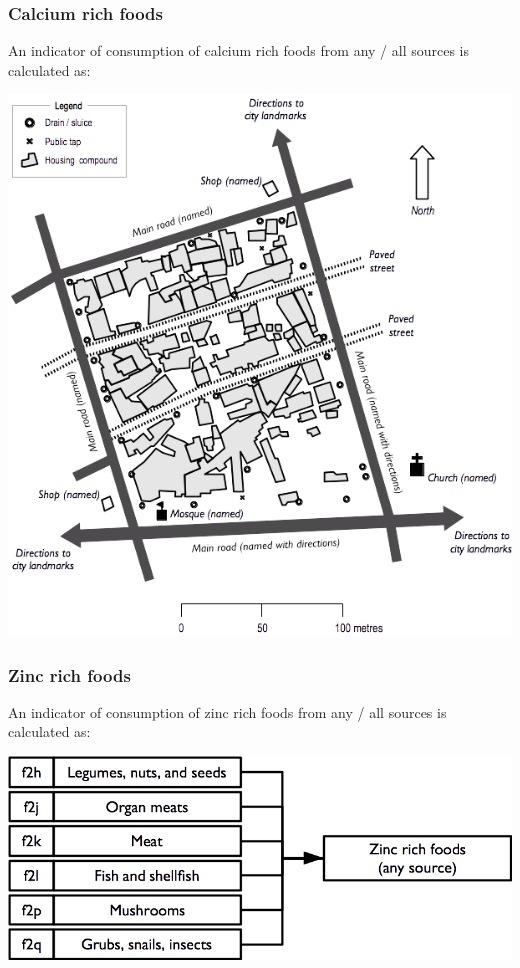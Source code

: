\documentclass[12pt,a4paper]{book}
\theoremstyle{definition}
\theoremstyle{definition}
\theoremstyle{definition}
\theoremstyle{remark}
\begin{document}
\hypertarget{calcium-rich-foods}{%
\subsubsection{Calcium rich foods}\label{calcium-rich-foods}}

An indicator of consumption of calcium rich foods from any / all sources
is calculated as:

\begin{center}\includegraphics{figures/indicators12} \end{center}

\hypertarget{zinc-rich-foods}{%
\subsubsection{Zinc rich foods}\label{zinc-rich-foods}}

An indicator of consumption of zinc rich foods from any / all sources is
calculated as:

\begin{center}\includegraphics{figures/indicators13} \end{center}
\end{document}

